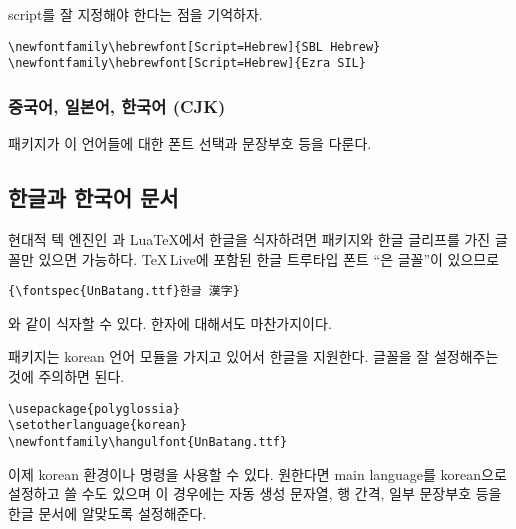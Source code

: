 script를 잘 지정해야 한다는 점을 기억하자.

\begin{lscommand}
\verb|\newfontfamily\hebrewfont[Script=Hebrew]{SBL Hebrew}| \\
\verb|\newfontfamily\hebrewfont[Script=Hebrew]{Ezra SIL}|
\end{lscommand}


\subsubsection{중국어, 일본어, 한국어 (CJK)}

\cite{xecjk} 패키지가 이 언어들에 대한 폰트 선택과 문장부호 등을 다룬다.


\subsection{한글과 한국어 문서}
현대적 텍 엔진인 \XeTeX 과 Lua\TeX 에서 한글을 식자하려면  패키지와 한글 글리프를 가진 글꼴만 
있으면 가능하다. \TeX\,Live에 포함된 한글 트루타입 폰트 ``은 글꼴''이 있으므로 
\begin{verbatim}
{\fontspec{UnBatang.ttf}한글 漢字}
\end{verbatim}
와 같이 식자할 수 있다. 한자에 대해서도 마찬가지이다.

 패키지는 korean 언어 모듈을 가지고 있어서 한글을 지원한다.
글꼴을 잘 설정해주는 것에 주의하면 된다.
\begin{verbatim}
\usepackage{polyglossia}
\setotherlanguage{korean}
\newfontfamily\hangulfont{UnBatang.ttf}
\end{verbatim}
이제 korean 환경이나  명령을 사용할 수 있다. 원한다면 main language를 korean으로 설정하고 쓸 수도
있으며 이 경우에는 자동 생성 문자열, 행 간격, 일부 문장부호 등을 한글 문서에 알맞도록 설정해준다.

